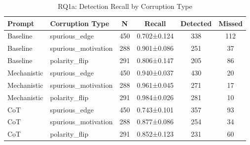 \begin{table}[htbp]
\centreing
\caption{RQ1a: Detection Recall by Corruption Type}
\label{tab:rq1a_corruption_type}
\begin{tabular}{llcccc}
\toprule
\textbf{Prompt} & \textbf{Corruption Type} & \textbf{N} & \textbf{Recall} & \textbf{Detected} & \textbf{Missed} \\
\midrule
Baseline & spurious_edge & 450 & 0.702±0.124 & 338 & 112 \\
Baseline & spurious_motivation & 288 & 0.901±0.086 & 251 & 37 \\
Baseline & polarity_flip & 291 & 0.806±0.147 & 205 & 86 \\
Mechanistic & spurious_edge & 450 & 0.940±0.037 & 430 & 20 \\
Mechanistic & spurious_motivation & 288 & 0.961±0.045 & 271 & 17 \\
Mechanistic & polarity_flip & 291 & 0.984±0.026 & 281 & 10 \\
CoT & spurious_edge & 450 & 0.743±0.101 & 357 & 93 \\
CoT & spurious_motivation & 288 & 0.877±0.086 & 254 & 34 \\
CoT & polarity_flip & 291 & 0.852±0.123 & 231 & 60 \\
\bottomrule
\end{tabular}
\end{table}